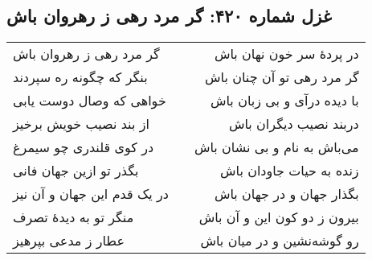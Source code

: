 \begin{center}
\section*{غزل شماره ۴۲۰: گر مرد رهی ز رهروان باش}
\label{sec:420}
\begin{longtable}{l p{0.5cm} r}
گر مرد رهی ز رهروان باش
&&
در پردهٔ سر خون نهان باش
\\
بنگر که چگونه ره سپردند
&&
گر مرد رهی تو آن چنان باش
\\
خواهی که وصال دوست یابی
&&
با دیده درآی و بی زبان باش
\\
از بند نصیب خویش برخیز
&&
دربند نصیب دیگران باش
\\
در کوی قلندری چو سیمرغ
&&
می‌باش به نام و بی نشان باش
\\
بگذر تو ازین جهان فانی
&&
زنده به حیات جاودان باش
\\
در یک قدم این جهان و آن نیز
&&
بگذار جهان و در جهان باش
\\
منگر تو به دیدهٔ تصرف
&&
بیرون ز دو کون این و آن باش
\\
عطار ز مدعی بپرهیز
&&
رو گوشه‌نشین و در میان باش
\\
\end{longtable}
\end{center}
